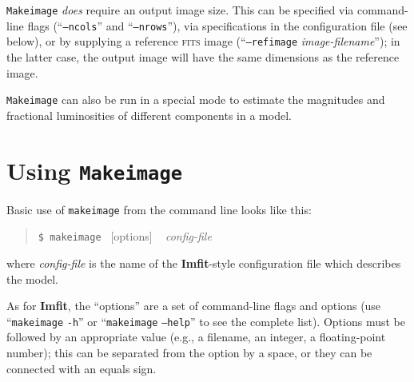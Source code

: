 \documentclass[10pt,a4paper,article]{memoir}
\newcommand{\imfit}{\textbf{Imfit}}
\newcommand{\makeimage}{\texttt{makeimage}}
\newcommand{\Makeimage}{\texttt{Makeimage}}
\begin{document}
\Makeimage{} \textit{does} require an output image size.  This can be specified
via command-line flags (``\texttt{--ncols}'' and ``\texttt{--nrows}''), via
specifications in the configuration file (see below), or by supplying a
reference \textsc{fits} image (``\texttt{--refimage} \textit{image-filename}''); in the
latter case, the output image will have the same dimensions as the reference
image.

\Makeimage{} can also be run in a special mode to estimate the
magnitudes and fractional luminosities of different components in a
model.


\section{Using \Makeimage{}}

Basic use of \makeimage{} from the command line looks like this:
\begin{quote}
  \texttt{\$ \makeimage{} }  [options] ~ \textit{config-file}
\end{quote}
where \textit{config-file} is the name of the \imfit{}-style configuration file
which describes the model.

As for \imfit, the ``options'' are a set of command-line flags and
options (use ``\makeimage{} \texttt{-h}'' or ``\makeimage{} \texttt{--help}'' to
see the complete list). Options must be followed by an appropriate value
(e.g., a filename, an integer, a floating-point number); this can be
separated from the option by a space, or they can be connected with an
equals sign.

\bigskip
\end{document}
